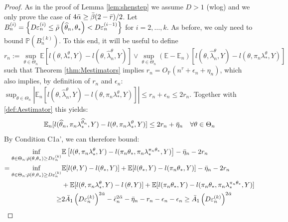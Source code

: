 \documentclass[12pt]{article}
\theoremstyle{myplain}
\theoremstyle{definition}
\theoremstyle{definition}
\theoremstyle{remark}
\numberwithin{equation}{section}
\begin{document}
\begin{proof}
As in the proof of Lemma \ref{lem:shenstep} we assume $D>1$ (wlog) and we only prove the case of $4 {\Bar\alpha} \geq {\Bar\beta}(2-\Bar r) / 2$. Let $B_{n}^{(i)}=\left\{D \varepsilon_{n}^{(i)} \leq \Bar\rho\left(\widehat{\theta}_{n}, \theta_*\right) <D \varepsilon_{n}^{(i-1)}\right\}$ for $i=2, \ldots, k$. As before, we only need to bound $\mathbb{P}\left(B_{n}^{(k)}\right)$. To this end, it will be useful to define
$$r_n := \sup_{\theta\in\Theta_n}\mathbb{E}[l(\theta,\lambda_*^\theta, Y)-l(\theta, \widehat{\lambda}_n^\theta, Y)] \vee \sup_{\theta\in\Theta_n}(\mathbb{E}-\mathbb{E}_n)[l(\theta, \widehat{\lambda}_n^\theta, Y)-l(\theta,\pi_n\lambda_*^\theta, Y)]$$
such that Theorem \ref{thm:Mestimators} implies $r_n = O_\mathbb{P}(n^\tau + \epsilon_n + \eta_n)$, 
which also implies, by definition of $r_n$ and $\epsilon_n$: $\sup_{\theta\in\Theta_n}\left|\mathbb{E}_n [l(\theta, \widehat{\lambda}_n^\theta, Y)-l(\theta,\pi_n\lambda_*^\theta, Y)]\right|\leq r_n + \epsilon_n\leq 2 r_n$. Together with \ref{def:Aestimator} this yields:
\begin{equation}
\label{eq:empiricalAloss}
    \mathbb{E}_n [l(\widehat{\theta}_n, \pi_n\lambda_*^{\widehat{\theta}_n}, Y)-l(\theta,\pi_n\lambda_*^\theta, Y)] \leq 2 r_n + \Bar\eta_n \quad \forall\theta\in\Theta_n
\end{equation}
By Condition C1a', we can therefore bound:
\begin{align}
\begin{split}
\inf_{{\theta\in\Theta_n: \Bar\rho\left(\theta, \theta_*\right) \geq D \varepsilon_{n}^{(k)}}} & \mathbb{E}\left[l(\theta, \pi_{n} \lambda_*^\theta, Y)-l(\pi_n \theta_*, \pi_{n} \lambda_*^{\pi_n \theta_*}, Y)\right]-{\Bar\eta}_{n} - 2 r_n\\
 = \inf_{{\theta\in\Theta_n: \Bar\rho\left(\theta, \theta_*\right) \geq D \varepsilon_{n}^{(k)}}} & \mathbb{E}[l(\theta, Y)-l(\theta_*, Y)] + \mathbb{E}[l(\theta_*, Y)-l(\pi_n\theta_*, Y)] -{\Bar\eta}_{n} - 2 r_n\\
& + \mathbb{E}[l(\theta, \pi_{n} \lambda_*^\theta, Y)-l\left(\theta, Y\right)] + \mathbb{E}[l(\pi_n\theta_*, Y)-l(\pi_n \theta_*, \pi_{n} \lambda_*^{\pi_n \theta_*}, Y)]\\
 \geq & 2 {\Bar A}_1\left(D \varepsilon_{n}^{(k)}\right)^{2 {\Bar\alpha}} - \Bar\epsilon_n^{2\Bar\alpha}-{\Bar\eta}_{n} - r_n - \epsilon_n - \epsilon_n \geq  \Bar A_{1}\left(D \varepsilon_{n}^{(k)}\right)^{2 {\Bar\alpha}}
\end{split}
\end{align}

\end{proof}
\end{document}
